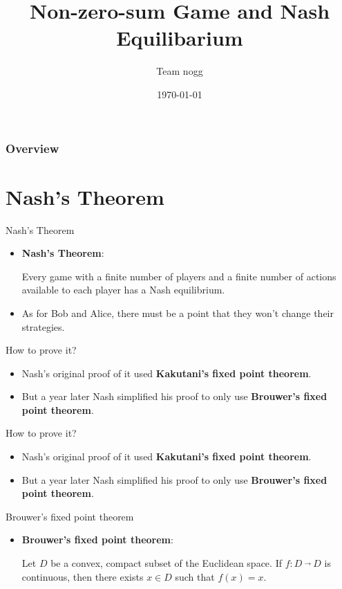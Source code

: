 \documentclass{beamer}
\title[Short title]{Non-zero-sum Game and Nash Equilibarium}
\author{Team nogg}
\institute[SJTU]
{

}
\date{\today}
\begin{document}
\begin{frame}
\titlepage
\end{frame}

\begin{frame}
\frametitle{Overview}
\tableofcontents
\end{frame}


\section{Nash’s Theorem}
\begin{frame}{Nash's Theorem}
	\begin{itemize}[<+->]
		\item \textbf{\large Nash's Theorem}:
		
		\qquad Every game with a finite number of players and a finite number of actions
		available to each player has a Nash equilibrium.
		\item As for Bob and Alice, there must be a point that they won't change their strategies.
	\end{itemize}
\end{frame}

\begin{frame}[fragile]{How to prove it?}
\begin{itemize}[<+->]
	\item Nash's original proof of it used \textbf{Kakutani's fixed point theorem}.
	\item But a year later Nash simplified his proof to only use \textbf{Brouwer’s fixed point theorem}.
\end{itemize}
\end{frame}

\begin{frame}[fragile]{How to prove it?}
	\begin{itemize}
		\item Nash's original proof of it used \textbf{Kakutani's fixed point theorem}.
		\item But a year later Nash simplified his proof to only use \textbf{\color{red}\large Brouwer’s fixed point theorem}.
	\end{itemize}
\end{frame}

\begin{frame}[fragile]{Brouwer’s fixed point theorem}
	\begin{itemize}
		\item \textbf{\large Brouwer’s fixed point theorem}:
		
		\qquad Let $D$ be a convex, compact subset of the Euclidean space. If $f : D\  \overrightarrow{}\ D$ is
		continuous, then there exists $x \in D$ such that $f (x) = x$.
	\end{itemize}
\end{frame}
\end{document}
